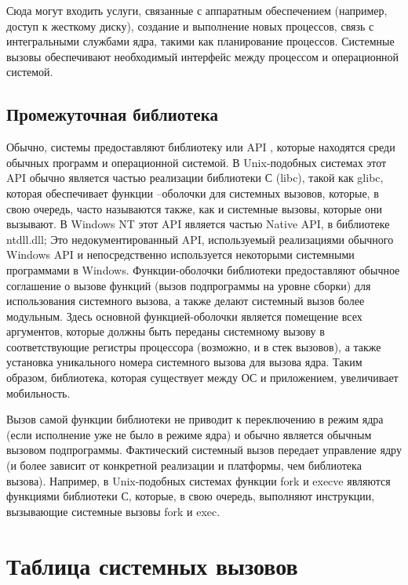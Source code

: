 Сюда могут входить услуги, связанные с аппаратным обеспечением (например, доступ к жесткому диску), создание и выполнение новых процессов, связь с интегральными службами ядра, такими как планирование процессов. Системные вызовы обеспечивают необходимый интерфейс между процессом и операционной системой.

\subsection{Промежуточная библиотека}%
\label{sub:promezhutochnaia_biblioteka}

Обычно, системы предоставляют библиотеку или API , которые находятся среди обычных программ и операционной системой. В Unix-подобных системах этот API обычно является частью реализации библиотеки С (libc), такой как glibc, которая обеспечивает функции –оболочки для системных вызовов, которые, в свою очередь, часто называются также, как и системные вызовы, которые они вызывают. В Windows NT этот API является частью Native API, в библиотеке ntdll.dll; Это недокументированный API, используемый реализациями обычного Windows API и непосредственно используется некоторыми системными программами в Windows. Функции-оболочки библиотеки предоставляют обычное соглашение о вызове функций (вызов подпрограммы на уровне сборки) для использования системного вызова, а также делают системный вызов более модульным. Здесь основной функцией-оболочки является помещение всех аргументов, которые должны быть переданы системному вызову в соответствующие регистры процессора (возможно, и в стек вызовов), а также установка уникального номера системного вызова для вызова ядра. Таким образом, библиотека, которая существует между ОС и приложением, увеличивает мобильность.

Вызов самой функции библиотеки не приводит к переключению в режим ядра (если исполнение уже не было в режиме ядра) и обычно является обычным вызовом подпрограммы. Фактический системный вызов передает управление ядру (и более зависит от конкретной реализации и платформы, чем библиотека вызова). Например, в Unix-подобных системах функции fork и execve являются функциями библиотеки С, которые, в свою очередь, выполняют инструкции, вызывающие системные вызовы fork и exec.

\section{Таблица системных вызовов}%
\label{sec:tablitsa_sistemnykh_vyzovov}

